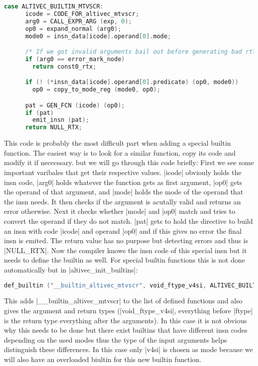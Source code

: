 \begin{lstlisting}[language=C++,basicstyle=\ttfamily\scriptsize,keywordstyle=\color{red}]
case ALTIVEC_BUILTIN_MTVSCR:
      icode = CODE_FOR_altivec_mtvscr;
      arg0 = CALL_EXPR_ARG (exp, 0);
      op0 = expand_normal (arg0);
      mode0 = insn_data[icode].operand[0].mode;

      /* If we got invalid arguments bail out before generating bad rtl.  */
      if (arg0 == error_mark_node)
    	return const0_rtx;

      if (! (*insn_data[icode].operand[0].predicate) (op0, mode0))
     	op0 = copy_to_mode_reg (mode0, op0);

      pat = GEN_FCN (icode) (op0);
      if (pat)
    	emit_insn (pat);
      return NULL_RTX;
\end{lstlisting}
This code is probably the most difficult part when adding a special builtin function. The easiest way is to look for a similar function, copy its code and modify it if nececssary. but we will go through this code briefly:
First we see some important varibales that get their respective values. |icode| obviouly holds the insn code, |arg0| holds whatever the function gets as first argument, |op0| gets the operand of that argument, and |mode| holds the mode of the operand that the insn needs. It then checks if the argument is acutally valid and returns an error otherwise. Next it checks whether |mode| and |op0| match and tries to convert the operand if they do not match. |pat| gets to hold the directive to build an insn with code |icode| and operand |op0| and if this gives no error the final insn is emited. The return value has no purpose but detecting errors and thus is |NULL_RTX|.
Now the compiler knows the insn code of this special insn but it needs to define the builtin as well. For special builtin functions this is not done automatically but in |altivec_init_builtins|:
\begin{lstlisting}[language=C++,basicstyle=\ttfamily\scriptsize,keywordstyle=\color{red}] 
def_builtin ("__builtin_altivec_mtvscr", void_ftype_v4si, ALTIVEC_BUILTIN_MTVSCR);
\end{lstlisting}
This adds |__builtin_altivec_mtvscr| to the list of defined functions and also gives the argument and return types (|void_ftype_v4si|, everything before |ftype| is the return type everything after the arguments). In this case it is not obvious why this needs to be done but there exist builtins that have different insn codes depending on the used modes thus the type of the input arguments helps distinguish these differences. In this case only |v4si| is chosen as mode because we will also have an overloaded biultin for this new builtin function.
